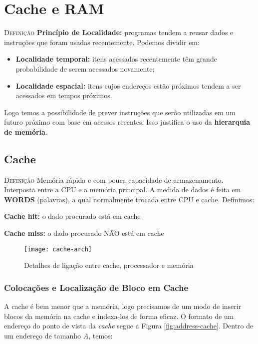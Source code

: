 \chapter{Cache e RAM}

\textsc{Definição} \textbf{Princípio de Localidade:} programas tendem a reusar dados e instruções que foram usadas recentemente. Podemos dividir em:

\begin{itemize}
  \item \textbf{Localidade temporal:} itens acessados recentemente têm grande probabilidade de serem acessados novamente;

  \item \textbf{Localidade espacial:} itens cujos endereços estão próximos tendem a ser acessados em tempos próximos.
\end{itemize}

Logo temos a possibilidade de prever instruções que serão utilizadas em um futuro próximo com base em acessos recentes. Isso justifica o uso da \textbf{hierarquia de memória}.


\section{Cache}
\textsc{Definição} Memória rápida e com pouca capacidade de armazenamento. Interposta entre a CPU e a memória principal. A medida de dados é feita em \textbf{WORDS} (palavras), a qual normalmente trocada entre CPU e cache. Definimos:

\textbf{Cache hit:} o dado procurado está em cache

\textbf{Cache miss:} o dado procurado NÃO está em cache

\begin{figure}[ht]
  \centering
  \texttt{[image: cache-arch]}
  \label{fig:cache-arc}
  \caption{Detalhes de ligação entre cache, processador e memória}
\end{figure}

\subsection{Colocações e Localização de Bloco em Cache}
A cache é bem menor que a memória, logo precisamos de um modo de inserir blocos da memória na cache e indexa-los de forma eficaz. O formato de um endereço do ponto de vista da \textit{cache} segue a Figura \ref{fig:address-cache}. Dentro de um endereço de tamanho $A$, temos:


